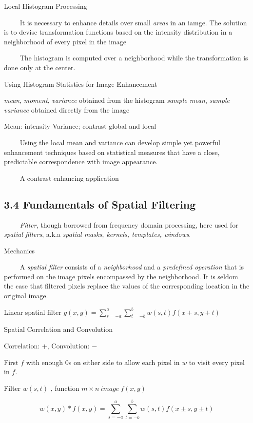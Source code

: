 \documentclass[]{article}
\begin{document}
Local Histogram Processing

\(\quad\quad\) It is necessary to enhance details over small
\emph{areas} in an iamge. The solution is to devise transformation
functions based on the intensity distribution in a neighborhood of every
pixel in the image

\(\quad\quad\) The histogram is computed over a neighborhood while the
transformation is done only at the center.

Using Histogram Statistics for Image Enhancement

\emph{mean}, \emph{moment}, \emph{variance} obtained from the histogram
\emph{sample mean}, \emph{sample variance} obtained directly from the
image

Mean: intensity Variance; contrast global and local

\(\quad\quad\) Using the local mean and variance can develop simple yet
powerful enhancement techniques based on statistical measures that have
a close, predictable correspondence with image appearance.

\(\quad\quad\) A contrast enhancing application

\subsection{3.4 Fundamentals of Spatial Filtering}\label{header-n254}

\(\quad\quad\) \emph{Filter}, though borrowed from frequency domain
processing, here used for \emph{spatial filters}, a.k.a \emph{spatial
masks, kernels, templates, windows}.

Mechanics

\(\quad\quad\) A \emph{spatial filter} consists of a \emph{neighborhood}
and a \emph{predefined operation} that is performed on the image pixels
encompassed by the neighborhood. It is seldom the case that filtered
pixels replace the values of the corresponding location in the original
image.

Linear spatial filter
\(g(x,y)=\sum\limits^a_{s=-a}\sum\limits^b_{t=-b}w(s,t)f(x+s,y+t)\)

Spatial Correlation and Convolution

Correlation: \(+\), Convolution: \(-\)

First \(f\) with enough 0s on either side to allow each pixel in \(w\)
to visit every pixel in \(f\).

Filter \(w(s,t)\) , function \(m\times n\ image\ f(x,y)\)

\[w(x,y)*f(x,y)=\sum\limits^a_{s=-a}\sum\limits^{b}_{t=-b}w(s,t)f(x\pm s,y\pm t)\]
\end{document}
